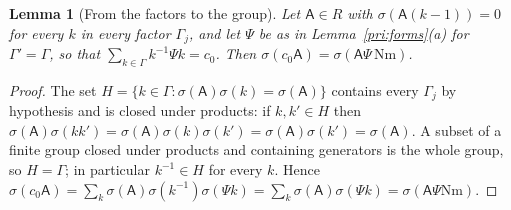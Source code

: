 \documentclass[10pt]{amsart}
\newtheorem{lemma}[theorem]{Lemma}
\theoremstyle{definition}
\theoremstyle{remark}
\begin{document}
\begin{lemma}[From the factors to the group]\label{prm:invariant}
Let $\mathsf A\in R$ with $\sigma(\mathsf A(k-1))=0$ for every $k$ in every factor $\Gamma_j$, and let
$\Psi$ be as in Lemma~\ref{pri:forms}(a) for $\Gamma'=\Gamma$, so that $\sum_{k\in\Gamma}k^{-1}\Psi k=
c_0$. Then $\sigma(c_0\mathsf A)=\sigma(\mathsf A\Psi\,\mathrm{Nm})$.
\end{lemma}
\begin{proof}
The set $H=\{k\in\Gamma:\sigma(\mathsf A)\sigma(k)=\sigma(\mathsf A)\}$ contains every $\Gamma_j$ by
hypothesis and is closed under products: if $k,k'\in H$ then $\sigma(\mathsf A)\sigma(kk')=
\sigma(\mathsf A)\sigma(k)\sigma(k')=\sigma(\mathsf A)\sigma(k')=\sigma(\mathsf A)$. A subset of a finite
group closed under products and containing generators is the whole group, so $H=\Gamma$; in particular
$k^{-1}\in H$ for every $k$. Hence
$\sigma(c_0\mathsf A)=\sum_k\sigma(\mathsf A)\sigma(k^{-1})\sigma(\Psi k)=\sum_k\sigma(\mathsf A)\sigma(\Psi
k)=\sigma(\mathsf A\Psi\mathrm{Nm})$.
\end{proof}
\end{document}
